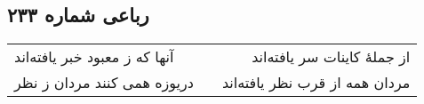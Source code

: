 \begin{center}
\section*{رباعی شماره ۲۳۳}
\label{sec:sh233}
\begin{longtable}{l p{0.5cm} r}
آنها که ز معبود خبر یافته‌اند
&&
از جملهٔ کاینات سر یافته‌اند
\\
دریوزه همی کنند مردان ز نظر
&&
مردان همه از قرب نظر یافته‌اند
\\
\end{longtable}
\end{center}
